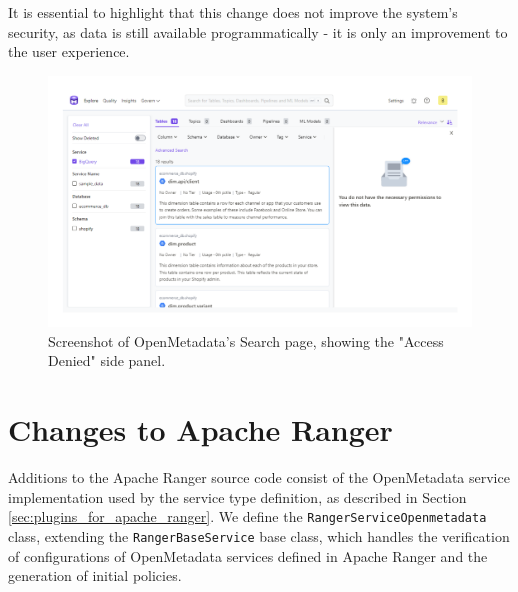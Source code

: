 It is essential to highlight that this change does not improve the system's security, as data is still available programmatically - it is only an improvement to the user experience.

\begin{figure}
    \centering
    \includegraphics[width=\textwidth]{chapters/implementation/figures/openmetadata_sample_data_explore_denied.pdf}
    \caption{Screenshot of OpenMetadata's Search page, showing the "Access Denied" side panel.}
    \label{fig:openmetadata_sample_data_explore_denied}
\end{figure}



\section{Changes to Apache Ranger}

Additions to the Apache Ranger source code consist of the OpenMetadata service implementation used by the service type definition, as described in Section \ref{sec:plugins_for_apache_ranger}. We define the \texttt{RangerServiceOpenmetadata} class, extending the \texttt{RangerBaseService} base class, which handles the verification of configurations of OpenMetadata services defined in Apache Ranger and the generation of initial policies.

